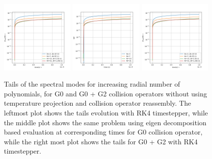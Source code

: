 \documentclass{article}
\begin{document}
\begin{figure}[H]
	\centering
	\includegraphics[width=0.32\textwidth]{fig/g0_tails_no_proj_no_reassembly_rk4.png}
	\includegraphics[width=0.32\textwidth]{fig/g0_tails_no_proj_no_reassembly_eig.png}
	\includegraphics[width=0.32\textwidth]{fig/g02_tails_no_proj_no_reassembly_rk4.png}
	\caption{Tails of the spectral modes for increasing radial number of polynomials, for G0 and G0 + G2 collision operators without using temperature projection and collision operator reassembly. The leftmost plot shows the tails evolution with RK4 timestepper, while the middle plot shows the same problem using eigen decomposition based evaluation at corresponding times for G0 collision operator, while the right most plot shows the tails for G0 + G2 with RK4 timestepper. \label{fig:proj_g0_g02_tails_no_proj}}
\end{figure}
\end{document}
